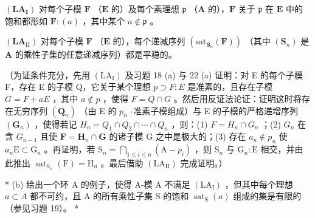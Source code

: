 \((\mathbf{LA}_{\mathbf{I}})\) 对每个子模 \(\mathbf{F}\) （\(\mathbf{E}\) 的）及每个素理想 \(\mathfrak{p}\) （\(\mathbf{A}\) 的），\(\mathbf{F}\) 关于 \(\mathfrak{p}\) 在 \(\mathbf{E}\) 中的饱和都形如 \(\mathbf{F}:(a)\) ，其中某个 \(a\notin\mathfrak{p}\) 。

\((\mathbf{L}\mathbf{A}_{\mathrm{II}})\) 对每个子模 \(\mathbf{F}\) （\(\mathbf{E}\) 的），每个递减序列 \((\mathrm{sat}_{\mathbf{S}_{n}}(\mathbf{F}))\) （其中 \((\mathbf{S}_{n})\) 是 \(\mathbf{A}\) 的乘性子集的任意递减序列）都是平稳的。

（为证条件充分，先用 \((\mathrm{LA}_{\mathrm{I}})\) 及习题 18 (a) 与 22 (a) 证明：对 E 的每个子模 F，存在 E 的子模 Q，它关于某个理想 \(p \supset F: E\) 是准素的，且存在子模 \(G = F + aE\) ，其中 \(a \notin p\) ，使得 \(F = Q \cap G\) 。然后用反证法论证：证明这时将存在无穷序列 \((\mathbf{Q}_{n})\) （由 E 的 \(p_{n}\) -准素子模组成）与 E 的子模的严格递增序列 \((\mathbf{G}_{n})\) ，使得若记 \(H_{n} = Q_{1} \cap Q_{2} \cap \cdots \cap Q_{n}\) ，则：(1) \(F = H_{n} \cap G_{n}\) ；(2) \(G_{n}\) 在含 \(G_{n-1}\) 且使 \(\mathbf{F} = \mathbf{H}_n \cap \mathbf{G}\) 的诸子模 G 之中是极大的；(3) 存在 \(a_n \notin p_n\) 使 \(a_n \mathrm{E} \subset \mathrm{G}_n\) 。再证明，若 \(\mathrm{S}_n = \bigcap_{1 \leqslant i \leqslant n} (\mathrm{A} - p_i)\) ，则 \(\mathrm{S}_n\) 与 \(\mathrm{G}_n: \mathrm{E}\) 相交，并由此推出 \(\operatorname{sat}_{\mathrm{S}_n}(\mathrm{F}) = \mathrm{H}_n\) 。最后借助 \((\mathrm{LA}_{\mathrm{II}})\) 完成证明。）

* (b) 给出一个环 A 的例子，使得 A-模 A 不满足 \((\mathrm{LA}_{\mathrm{I}})\) ，但其中每个理想 \(a \subset A\) 都不可约，且 A 的所有乘性子集 S 的饱和 \(\operatorname{sat}_{\mathrm{S}}(a)\) 组成的集是有限的（参见习题 19）。 *

